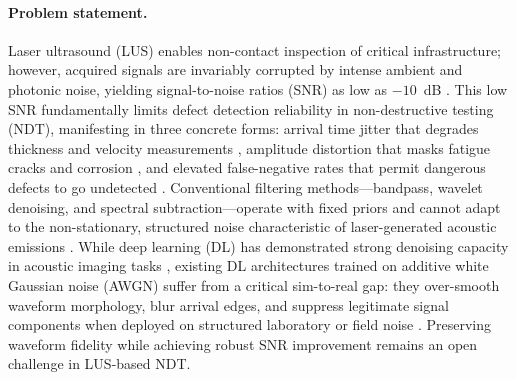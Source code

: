 \paragraph{Problem statement.}
Laser ultrasound (LUS) enables non-contact inspection of critical infrastructure; however, acquired signals are invariably corrupted by intense ambient and photonic noise, yielding signal-to-noise ratios (SNR) as low as $-10$~dB \cite{laser_ultrasound_noise}. This low SNR fundamentally limits defect detection reliability in non-destructive testing (NDT), manifesting in three concrete forms: arrival time jitter that degrades thickness and velocity measurements \cite{arrival_time_jitter}, amplitude distortion that masks fatigue cracks and corrosion \cite{amplitude_distortion}, and elevated false-negative rates that permit dangerous defects to go undetected \cite{false_negative_ndt}. Conventional filtering methods---bandpass, wavelet denoising, and spectral subtraction---operate with fixed priors and cannot adapt to the non-stationary, structured noise characteristic of laser-generated acoustic emissions \cite{conventional_filter_limits}. While deep learning (DL) has demonstrated strong denoising capacity in acoustic imaging tasks \cite{deep_learning_ultrasound}, existing DL architectures trained on additive white Gaussian noise (AWGN) suffer from a critical sim-to-real gap: they over-smooth waveform morphology, blur arrival edges, and suppress legitimate signal components when deployed on structured laboratory or field noise \cite{over_smoothing_issue,sim_to_real_gap}. Preserving waveform fidelity while achieving robust SNR improvement remains an open challenge in LUS-based NDT.
